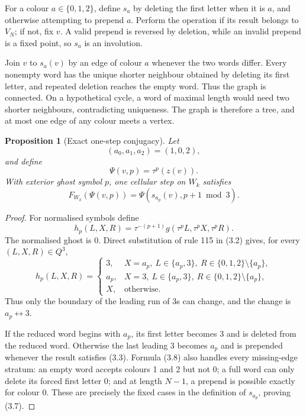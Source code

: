 \documentclass[11pt]{amsart}
\newtheorem{proposition}[theorem]{Proposition}
\theoremstyle{definition}
\begin{document}
For a colour \(a\in\{0,1,2\}\), define \(s_a\) by deleting the first
letter when it is \(a\), and otherwise attempting to prepend \(a\).  Perform
the operation if its result belongs to \(V_N\); if not, fix \(v\).  A valid
prepend is reversed by deletion, while an invalid prepend is a fixed point,
so \(s_a\) is an involution.

Join \(v\) to \(s_a(v)\) by an edge of colour \(a\) whenever the two words
differ.  Every nonempty word has the unique shorter neighbour obtained by
deleting its first letter, and repeated deletion reaches the empty word.
Thus the graph is connected.  On a hypothetical cycle, a word of maximal
length would need two shorter neighbours, contradicting uniqueness.  The graph
is therefore a tree, and at most one edge of any colour meets a vertex.

\begin{proposition}[Exact one-step conjugacy]\label{prop:conjugacy}
Let
\[
(a_0,a_1,a_2)=(1,0,2),                                \tag{3.5}
\]
and define
\[
\Psi(v,p)=\tau^p(z(v)).                                \tag{3.6}
\]
With exterior ghost symbol \(p\), one cellular step on \(W_k\) satisfies
\[
F_{W_k}(\Psi(v,p))=
\Psi(s_{a_p}(v),p+1\bmod3).                            \tag{3.7}
\]
\end{proposition}

\begin{proof}
For normalised symbols define
\[
h_p(L,X,R)=\tau^{-(p+1)}
g(\tau^{p}L,\tau^{p}X,\tau^{p}R).
\]
The normalised ghost is 0.  Direct substitution of rule 115 in (3.2) gives,
for every \((L,X,R)\in Q^3\),
\[
h_p(L,X,R)=
\begin{cases}
3,&X=a_p,\ L\in\{a_p,3\},\
     R\in\{0,1,2\}\setminus\{a_p\},\\
a_p,&X=3,\ L\in\{a_p,3\},\
     R\in\{0,1,2\}\setminus\{a_p\},\\
X,&\text{otherwise}.
\end{cases}                                           \tag{3.8}
\]
Thus only the boundary of the leading run of 3s can change, and the change is
\(a_p\leftrightarrow3\).

If the reduced word begins with \(a_p\), its first letter becomes 3 and is
deleted from the reduced word.  Otherwise the last leading 3 becomes \(a_p\)
and is prepended whenever the result satisfies (3.3).  Formula (3.8) also
handles every missing-edge stratum: an empty word accepts colours 1 and 2 but
not 0; a full word can only delete its forced first letter 0; and at length
\(N-1\), a prepend is possible exactly for colour 0.  These are precisely the
fixed cases in the definition of \(s_{a_p}\), proving (3.7).
\end{proof}
\end{document}
